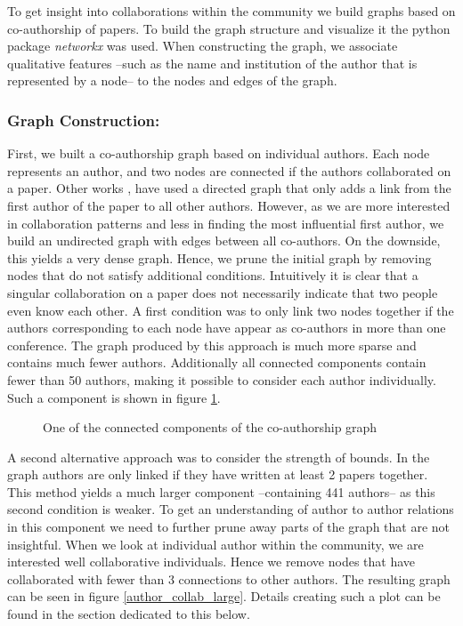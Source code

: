 \documentclass[journal,twocolumn]{IEEEtran}
\begin{document}
To get insight into collaborations within the community we build graphs
based on co-authorship of papers. To build the graph structure and
visualize it the python package \emph{networkx} was used. When
constructing the graph, we associate qualitative features --such as the
name and institution of the author that is represented by a node-- to
the nodes and edges of the graph.

\hypertarget{graph-construction}{%
\subsubsection{Graph Construction:}\label{graph-construction}}

First, we built a co-authorship graph based on individual authors. Each
node represents an author, and two nodes are connected if the authors
collaborated on a paper. Other works \cite{cheong2009social},
\cite{hesford2006management} have used a directed graph that only adds a
link from the first author of the paper to all other authors. However,
as we are more interested in collaboration patterns and less in finding
the most influential first author, we build an undirected graph with
edges between all co-authors. On the downside, this yields a very dense
graph. Hence, we prune the initial graph by removing nodes that do not
satisfy additional conditions. Intuitively it is clear that a singular
collaboration on a paper does not necessarily indicate that two people
even know each other. A first condition was to only link two nodes
together if the authors corresponding to each node have appear as
co-authors in more than one conference. The graph produced by this
approach is much more sparse and contains much fewer authors.
Additionally all connected components contain fewer than 50 authors,
making it possible to consider each author individually. Such a
component is shown in figure \ref{fig_plot}.


    \begin{figure}
        \begin{center}\end{center}
        \caption{One of the connected components of the co-authorship graph}
        \label{fig_plot}
    \end{figure}
    
    A second alternative approach was to consider the strength of bounds. In
the graph authors are only linked if they have written at least 2 papers
together. This method yields a much larger component --containing 441
authors-- as this second condition is weaker. To get an understanding of
author to author relations in this component we need to further prune
away parts of the graph that are not insightful. When we look at
individual author within the community, we are interested well
collaborative individuals. Hence we remove nodes that have collaborated
with fewer than 3 connections to other authors. The resulting graph can
be seen in figure \ref{author_collab_large}. Details creating such a
plot can be found in the section dedicated to this below.
\end{document}

